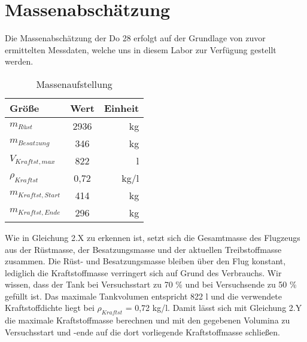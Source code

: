 \chapter{Massenabschätzung}
\label{chapter:masse}
Die Massenabschätzung der Do 28 erfolgt auf der Grundlage von zuvor ermittelten Messdaten, welche uns in diesem Labor zur Verfügung gestellt werden. \\

\begin{table}[h]
	\centering
	\begin{tabular}{|l|c|r|}
		\hline
	\textbf{Größe}		 & \textbf{Wert}& \textbf{Einheit} \\ \hline
	$m_{Rüst}$  		 & 2936			& {kg}        \\ \hline
	$m_{Besatzung}$ 	 & 346			& {kg}		  \\ \hline
	$V_{Kraftst,max}$    & 822			& {l}		  \\ \hline
	$\rho_{Kraftst}$ 	 & 0,72			& {kg/l}	  \\ \hline
	$m_{Kraftst,Start}$	 & 414			& {kg}		  \\ \hline
	$m_{Kraftst,Ende}$	 & 296			& {kg}		  \\ \hline	


\end{tabular}
	\caption{Massenaufstellung}
\end{table}

Wie in Gleichung 2.X zu erkennen ist, setzt sich die Gesamtmasse des Flugzeugs aus der Rüstmasse, der Besatzungsmasse und der aktuellen Treibstoffmasse zusammen. Die Rüst- und Besatzungsmasse bleiben über den Flug konstant, lediglich die Kraftstoffmasse verringert sich auf Grund des Verbrauchs. Wir wissen, dass der Tank bei Versuchsstart zu 70 \% und bei Versuchsende zu 50 \% gefüllt ist. Das maximale Tankvolumen entspricht 822 {l} und die verwendete Kraftstoffdichte liegt bei $\rho_{Kraftst}$ = 0,72 {kg/l}. Damit lässt sich mit Gleichung 2.Y die maximale Kraftstoffmasse berechnen und mit den gegebenen Volumina zu Versuchsstart und -ende auf die dort vorliegende Kraftstoffmasse schließen.



\newpage